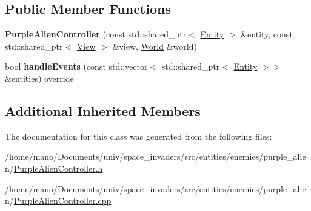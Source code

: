 \subsection*{Public Member Functions}
\begin{DoxyCompactItemize}
\item 
\mbox{\label{classentities_1_1enemies_1_1purple__alien_1_1PurpleAlienController_a4b88d417d2e14f4bc551be7b54aa31e1}} 
{\bfseries Purple\+Alien\+Controller} (const std\+::shared\+\_\+ptr$<$ \hyperlink{classentities_1_1Entity}{Entity} $>$ \&entity, const std\+::shared\+\_\+ptr$<$ \hyperlink{classentities_1_1View}{View} $>$ \&view, \hyperlink{classWorld}{World} \&world)
\item 
\mbox{\label{classentities_1_1enemies_1_1purple__alien_1_1PurpleAlienController_a799cfca29a4cd55b64a7fa4fc5753d59}} 
bool {\bfseries handle\+Events} (const std\+::vector$<$ std\+::shared\+\_\+ptr$<$ \hyperlink{classentities_1_1Entity}{Entity} $>$$>$ \&entities) override
\end{DoxyCompactItemize}
\subsection*{Additional Inherited Members}


The documentation for this class was generated from the following files\+:\begin{DoxyCompactItemize}
\item 
/home/mano/\+Documents/univ/space\+\_\+invaders/src/entities/enemies/purple\+\_\+alien/\hyperlink{PurpleAlienController_8h}{Purple\+Alien\+Controller.\+h}\item 
/home/mano/\+Documents/univ/space\+\_\+invaders/src/entities/enemies/purple\+\_\+alien/\hyperlink{PurpleAlienController_8cpp}{Purple\+Alien\+Controller.\+cpp}\end{DoxyCompactItemize}
